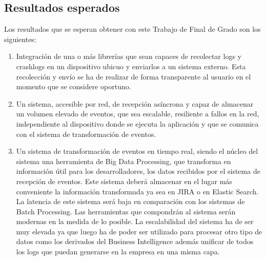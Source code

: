 \subsection{Resultados esperados}
Los resultados que se esperan obtener con este Trabajo de Final de Grado son los siguientes:

\begin{enumerate}
		
	\item Integración de una o más librerías que sean capaces de recolectar logs y crashlogs en un dispositivo ubicuo y enviarlos a un sistema externo. Esta recolección y envío se ha de realizar de forma transparente al usuario en el momento que se considere oportuno. 
	
	\item Un sistema, accesible por red, de recepción asíncrona y capaz de almacenar un volumen elevado de eventos, que sea escalable, resiliente a fallos en la red, independiente al dispositivo donde se ejecuta la aplicación y que se comunica con el sistema de transformación de eventos.
	
	\item Un sistema de transformación de eventos en tiempo real, siendo el núcleo del sistema una herramienta de Big Data Processing, que transforma en información útil para los desarrolladores, los datos recibidos por el sistema de recepción de eventos. Este sistema deberá almacenar en el lugar más conveniente la información transformada ya sea en JIRA o en Elastic Search. La latencia de este sistema será baja en comparación con los sistemas de Batch Processing. Las herramientas que compondrán al sistema serán modernas en la medida de lo posible. La escalabilidad del sistema ha de ser muy elevada ya que luego ha de poder ser utilizado para procesar otro tipo de datos como los derivados del Business Intelligence además unificar de todos los logs que puedan generarse en la empresa en una misma capa.
	
\end{enumerate}





